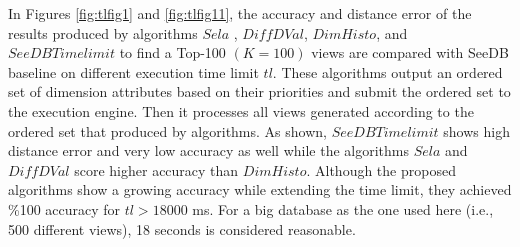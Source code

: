 In Figures \ref{fig:tlfig1} and \ref{fig:tlfig11}, the accuracy and distance error of the results produced by
algorithms $Sela$ , $Diff DVal$, $DimHisto$, and $SeeDB Timelimit$ to find a Top-100 $(K=100)$ views are compared with SeeDB baseline on different execution time limit $tl$. 
%
These algorithms output an ordered set of dimension attributes based on their priorities and submit the ordered set to the execution engine.
%
Then it processes all views generated according to the ordered set that produced by algorithms.
%
As shown, $SeeDB Timelimit$ shows high distance error and very low accuracy as well while the algorithms $Sela$ and $Diff DVal$ score higher accuracy than $DimHisto$. 
%
Although the proposed algorithms show a growing accuracy while extending the time limit, they achieved \%100 accuracy for $tl > 18000$ ms.
%
For a big database as the one used here (i.e., 500 different views), 18 seconds is considered reasonable.
%
%
%

